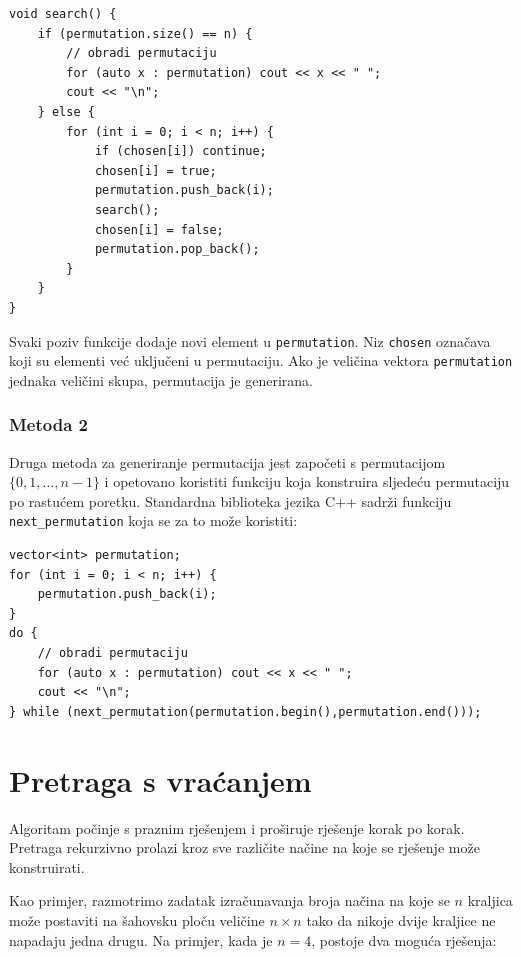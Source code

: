 \begin{lstlisting}
void search() {
    if (permutation.size() == n) {
        // obradi permutaciju
        for (auto x : permutation) cout << x << " ";
        cout << "\n";
    } else {
        for (int i = 0; i < n; i++) {
            if (chosen[i]) continue;
            chosen[i] = true;
            permutation.push_back(i);
            search();
            chosen[i] = false;
            permutation.pop_back();
        }
    }
}
\end{lstlisting}

Svaki poziv funkcije dodaje novi element u
\texttt{permutation}.
Niz \texttt{chosen} označava koji su
elementi već uključeni u permutaciju.
Ako je veličina vektora \texttt{permutation} jednaka veličini skupa,
permutacija je generirana.

\subsubsection{Metoda 2}


Druga metoda za generiranje permutacija
jest započeti s permutacijom
$\{0,1,\ldots,n-1\}$ i opetovano
koristiti funkciju koja konstruira sljedeću permutaciju
po rastućem poretku.
Standardna biblioteka jezika C++ sadrži funkciju
\texttt{next\_permutation} koja se za to može koristiti:

\begin{lstlisting}
vector<int> permutation;
for (int i = 0; i < n; i++) {
    permutation.push_back(i);
}
do {
    // obradi permutaciju
    for (auto x : permutation) cout << x << " ";
    cout << "\n";
} while (next_permutation(permutation.begin(),permutation.end()));
\end{lstlisting}

\section{Pretraga s vraćanjem}


Algoritam 
počinje s praznim rješenjem
i proširuje rješenje korak po korak.
Pretraga rekurzivno
prolazi kroz sve različite načine na koje se
rješenje može konstruirati.


Kao primjer, razmotrimo zadatak
izračunavanja broja
načina na koje se $n$ kraljica može postaviti na
šahovsku ploču veličine $n \times n$ tako da
nikoje dvije kraljice ne napadaju jedna drugu.
Na primjer, kada je $n=4$,
postoje dva moguća rješenja:

